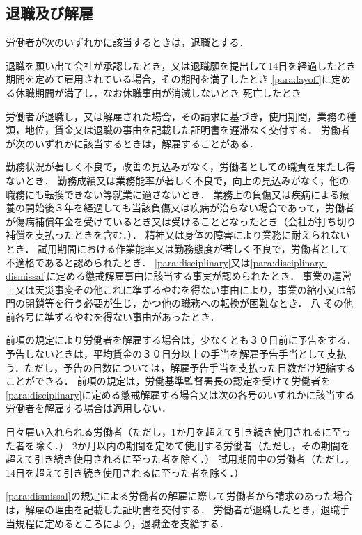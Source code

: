 \documentclass[11pt,a4paper]{jsarticle}
\begin{document}
\subsection{退職及び解雇}
労働者が次のいずれかに該当するときは，退職とする．
\begin{enumerate}
	\itm 退職を願い出て会社が承認したとき，又は退職願を提出して14日を経過したとき
	\itm 期間を定めて雇用されている場合，その期間を満了したとき
	\itm \ref{para:layoff}に定める休職期間が満了し，なお休職事由が消滅しないとき
	\itm 死亡したとき
\end{enumerate}
\term
労働者が退職し，又は解雇された場合，その請求に基づき，使用期間，業務の種類，地位，賃金又は退職の事由を記載した証明書を遅滞なく交付する．
労働者が次のいずれかに該当するときは，解雇することがある．
\label{para:dismissal}
\begin{enumerate}
	\itm 勤務状況が著しく不良で，改善の見込みがなく，労働者としての職責を果たし得ないとき．
	\itm 勤務成績又は業務能率が著しく不良で，向上の見込みがなく，他の職務にも転換できない等就業に適さないとき．
	\itm 業務上の負傷又は疾病による療養の開始後３年を経過しても当該負傷又は疾病が治らない場合であって，労働者が傷病補償年金を受けているとき又は受けることとなったとき（会社が打ち切り補償を支払ったときを含む．）．
	\itm 精神又は身体の障害により業務に耐えられないとき．
	\itm 試用期間における作業能率又は勤務態度が著しく不良で，労働者として不適格であると認められたとき．
	\itm \ref{para:disciplinary}又は\ref{para:disciplinary-dismissal}に定める懲戒解雇事由に該当する事実が認められたとき．
	\itm 事業の運営上又は天災事変その他これに準ずるやむを得ない事由により，事業の縮小又は部門の閉鎖等を行う必要が生じ，かつ他の職務への転換が困難なとき．
	\itm 八	その他前各号に準ずるやむを得ない事由があったとき．
\end{enumerate}
\term
前項の規定により労働者を解雇する場合は，少なくとも３０日前に予告をする．予告しないときは，平均賃金の３０日分以上の手当を解雇予告手当として支払う．ただし，予告の日数については，解雇予告手当を支払った日数だけ短縮することができる．
\term
前項の規定は，労働基準監督署長の認定を受けて労働者を\ref{para:disciplinary}に定める懲戒解雇する場合又は次の各号のいずれかに該当する労働者を解雇する場合は適用しない．
\begin{enumerate}
	\itm 日々雇い入れられる労働者（ただし，1か月を超えて引き続き使用されるに至った者を除く．）
	\itm 2か月以内の期間を定めて使用する労働者（ただし，その期間を超えて引き続き使用されるに至った者を除く．）
	\itm 試用期間中の労働者（ただし，14日を超えて引き続き使用されるに至った者を除く．）
\end{enumerate}
\term
\ref{para:dismissal}の規定による労働者の解雇に際して労働者から請求のあった場合は，解雇の理由を記載した証明書を交付する．
労働者が退職したとき，退職手当規程に定めるところにより，退職金を支給する．
\label{para:severance}
\end{document}
